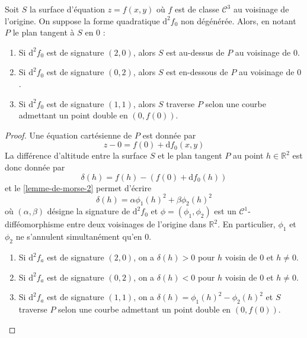 
  \begin{application}
    Soit $S$ la surface d'équation $z = f(x, y)$ où $f$ est de classe $\mathcal{C}^3$ au voisinage de l'origine. On suppose la forme quadratique $\mathrm{d}^2 f_0$ non dégénérée. Alors, en notant $P$ le plan tangent à $S$ en $0$ :
    \begin{enumerate}[label=(\roman*)]
      \item Si $\mathrm{d}^2 f_0$ est de signature $(2, 0)$, alors $S$ est au-dessus de $P$ au voisinage de $0$.
      \item Si $\mathrm{d}^2 f_0$ est de signature $(0, 2)$, alors $S$ est en-dessous de $P$ au voisinage de $0$.
      \item Si $\mathrm{d}^2 f_0$ est de signature $(1, 1)$, alors $S$ traverse $P$ selon une courbe admettant un point double en $(0, f(0))$.
    \end{enumerate}
  \end{application}

  \begin{proof}
    Une équation cartésienne de $P$ est donnée par
    \[ z - 0 = f(0) + \mathrm{d} f_0(x, y) \]
    La différence d'altitude entre la surface $S$ et le plan tangent $P$ au point $h \in \mathbb{R}^2$ est donc donnée par
    \[ \delta(h) = f(h) - (f(0) + \mathrm{d}f_0(h)) \]
    et le \cref{lemme-de-morse-2} permet d'écrire
    \[ \delta(h) = \alpha \phi_1(h)^2 + \beta \phi_2(h)^2 \]
    où $(\alpha, \beta)$ désigne la signature de $\mathrm{d}^2 f_0$ et $\phi = (\phi_1, \phi_2)$ est un $\mathcal{C}^1$-difféomorphisme entre deux voisinages de l'origine dans $\mathbb{R}^2$. En particulier, $\phi_1$ et $\phi_2$ ne s'annulent simultanément qu'en $0$.
    \begin{enumerate}[label=(\roman*)]
      \item Si $\mathrm{d}^2 f_a$ est de signature $(2, 0)$, on a $\delta(h) > 0$ pour $h$ voisin de $0$ et $h \neq 0$.
      \item Si $\mathrm{d}^2 f_a$ est de signature $(0, 2)$, on a $\delta(h) < 0$ pour $h$ voisin de $0$ et $h \neq 0$.
      \item Si $\mathrm{d}^2 f_a$ est de signature $(1, 1)$, on a $\delta(h) = \phi_1(h)^2 - \phi_2(h)^2$ et $S$ traverse $P$ selon une courbe admettant un point double en $(0, f(0))$.
    \end{enumerate}
  \end{proof}

